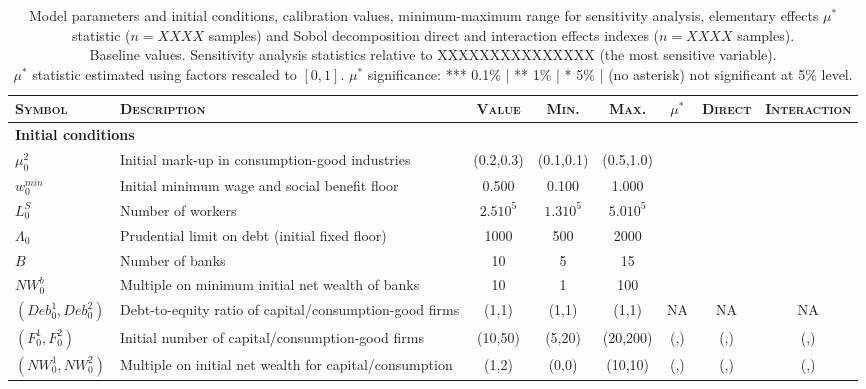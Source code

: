 \documentclass[a4paper,11pt]{article}
\begin{document}
\begin{appendices}
\begin{landscape}
\begin{table}[h]
\centering
\footnotesize
\begin{tabular}{llcccccc}
\toprule
\textsc{Symbol} 				& \textsc{Description} 									& \textsc{Value}	& \textsc{Min.}	& \textsc{Max.}	& \textsc{$\mu^*$}	& \textsc{Direct}	& \textsc{Interaction} \\
\midrule
\multicolumn{2}{l}{\textbf{Initial conditions}} \\
$\mu^2_0$						& Initial mark-up in consumption-good industries		& (0.2,0.3)			& (0.1,0.1)		& (0.5,1.0)		& 					& 					& 	 \\
$w_0^{min}$						& Initial minimum wage and social benefit floor			& 0.500				& 0.100			& 1.000			& 					& 					& 	 \\
$L^S_0$ 						& Number of workers 									& $2.5 10^5$		& $1.3 10^5$	& $5.0 10^5$	& 					& 					& 	 \\
$\Lambda_{0}$					& Prudential limit on debt (initial fixed floor)		& 1000				& 500			& 2000			& 					& 					& 	 \\
$B$								& Number of banks										& 10				& 5				& 15			& 					& 					& 	 \\
$NW^b_0$						& Multiple on minimum initial net wealth of banks		& 10				& 1				& 100			& 					& 					& 	 \\
$(Deb^1_0,Deb^2_0)$				& Debt-to-equity ratio of capital/consumption-good firms& (1,1)				& (1,1)			& (1,1)			& NA				& NA				& NA \\
$(F^1_0,F^2_0)$					& Initial number of capital/consumption-good firms		& (10,50)			& (5,20)		& (20,200)		& (,)				& (,)				& (,) \\
$(NW^1_0,NW^2_0)$ 				& Multiple on initial net wealth for capital/consumption& (1,2)				& (0,0)		& (10,10)			& (,)				& (,)				& (,) \\
\bottomrule
\end{tabular}
\caption{Model parameters and initial conditions, calibration values, minimum-maximum range for sensitivity analysis, elementary effects $\mu^*$ statistic ($n=XXXX$ samples) and Sobol decomposition direct and interaction effects indexes ($n=XXXX$ samples). \\
Baseline values. Sensitivity analysis statistics relative to XXXXXXXXXXXXXXX (the most sensitive variable). \\
$\mu^*$ statistic estimated using factors rescaled to $[0,1]$. $\mu^*$ significance: *** 0.1\% | ** 1\% | * 5\% | (no asterisk) not significant at 5\% level.}
\label{Par}
\end{table}
\end{landscape}



\end{appendices}
\end{document}
